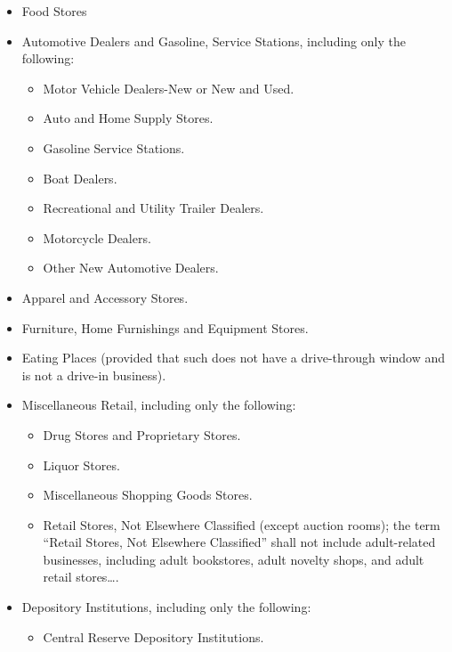 \begin{itemize}
\item Food Stores 

\item Automotive Dealers and Gasoline, Service Stations, including only the
following:
\begin{itemize}
\item Motor Vehicle Dealers-New or New and Used.

\item Auto and Home Supply Stores.

\item Gasoline Service Stations.

\item Boat Dealers.

\item Recreational and Utility Trailer Dealers.

\item Motorcycle Dealers.

\item Other New Automotive Dealers.
\end{itemize}
\item Apparel and Accessory Stores.

\item Furniture, Home Furnishings and Equipment Stores.

\item Eating Places (provided that such does not have a drive-through window and
is not a drive-in business).

\item Miscellaneous Retail, including only the following:
\begin{itemize}
\item Drug Stores and Proprietary Stores.

\item Liquor Stores.

\item Miscellaneous Shopping Goods Stores.

\item Retail Stores, Not Elsewhere Classified (except auction rooms); the term
``Retail Stores, Not Elsewhere Classified'' shall not include adult-related
businesses, including adult bookstores, adult novelty shops, and adult retail
stores\ldots.
\end{itemize}
\item Depository Institutions, including only the following:
\begin{itemize}
\item Central Reserve Depository Institutions.


\end{itemize}
\end{itemize}
